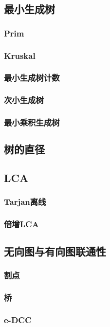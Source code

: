 \documentclass[twocolumn,a4]{article}
\newcommand{\addcpp}[1]{}
\begin{document}
	\subsection{最小生成树}
		\subsubsection{Prim}
		\subsubsection{Kruskal}
		\subsubsection{最小生成树计数}
		\subsubsection{次小生成树}
		\subsubsection{最小乘积生成树}
	\subsection{树的直径}
	\subsection{LCA}
		\subsubsection{Tarjan离线}
		\subsubsection{倍增LCA}
	\subsection{无向图与有向图联通性}
		\subsubsection{割点}
		\subsubsection{桥}
		\subsubsection{e-DCC}
\end{document}

